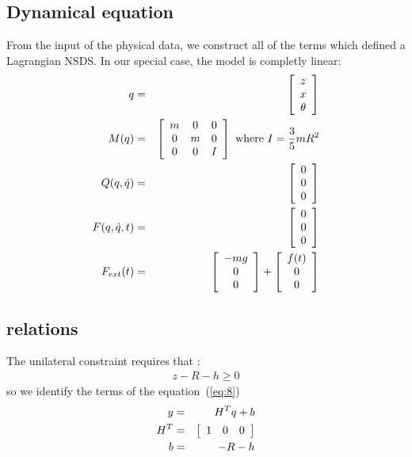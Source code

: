 \documentclass[10pt]{article}
\begin{document}
\subsection{Dynamical equation}

 From the input of the physical data, we construct all of the terms which defined a Lagrangian NSDS.   In our special case, the model is completly linear:
\begin{eqnarray}
  q&=&       \left[\begin{array}{c}
  z \\
  x \\
  \theta
  \end{array}\right]    \\
  M(q)&=&
  \left[\begin{array}{ccc}
  m &0 &0 \\
  0 & m & 0 \\
  0 & 0 & I
  \end{array}\right] \text{ where } I=\displaystyle \frac{3}{5} m R^2 \\
  Q(q,\dot q )& = &\left[\begin{array}{c}
  0 \\
  0  \\
  0
  \end{array}\right]  \\
  F(q, \dot q , t) &=&  \left[\begin{array}{c}
  0 \\
  0  \\
  0
  \end{array}\right] \\
  F_{ext}(t)& = & \left[\begin{array}{c}
  -m g \\
  0  \\
  0
  \end{array}\right] +  \left[\begin{array}{c}
  f(t)\\
  0  \\
  0
  \end{array}\right]
\end{eqnarray}

\subsection{relations}

The unilateral constraint requires that :
\begin{eqnarray}
  \label{eq:14}
  z-R -h \geq 0
\end{eqnarray}
so we identify the terms of the equation~(\ref{eq:8}) 
\begin{eqnarray}
  \label{eq:15}
  y&=&H^{T}q+b\\
  H^{T}&=& \left[
  \begin{array}[]{ccc}
  1 & 0 & 0
  \end{array}\right] \\
  b &=& -R - h
\end{eqnarray}
\end{document}
